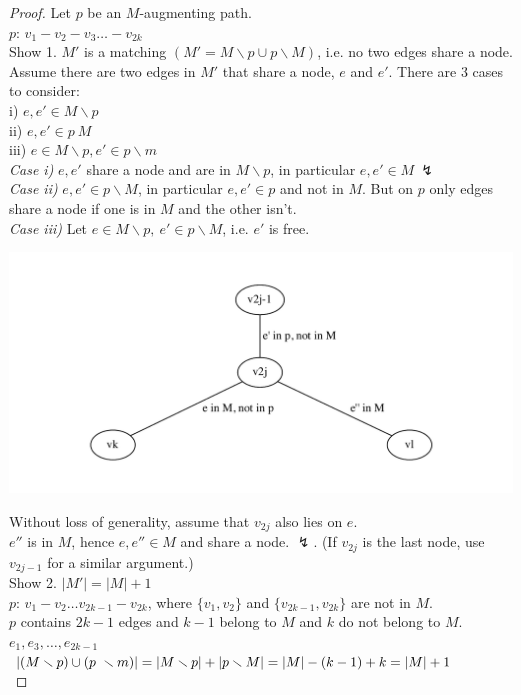 \begin{proof}
Let $p$ be an $M$-augmenting path. \\$p$: $v_{1} - v_{2} - v_{3} \dots -
v_{2k}$\\
Show 1. $M'$ is a matching $(M' = M \smallsetminus p \cup p \smallsetminus M)$, i.e. no two
edges share a node. Assume there are two edges in $M'$ that share a node, $e$
and $e'$. There are 3 cases to consider:\\
i) $e, e' \in M \smallsetminus p$ \\
ii) $e, e' \in p \ M$  \\
iii) $e \in M \smallsetminus p, e' \in p \smallsetminus m$ \\
\emph{Case i)} $e, e'$ share a node and are in $M \smallsetminus p$, in particular $e,
e' \in M \: \lightning $ \\
\emph{Case ii)} $e, e' \in p \smallsetminus M$, in particular $e, e' \in p$ and not in
$M$. But on $p$ only edges share a node if one is in $M$ and the other isn't. \\
\emph{Case iii)} Let $e \in M \smallsetminus p, \: e' \in p \smallsetminus M$,
i.e. $e'$ is free. 
\begin{example*}
		\includegraphics[scale=0.65]{diagrams/Chapter4_Example8.pdf}\\
\end{example*}
Without loss of generality, assume that $v_{2j}$ also lies on $e$. \\
$e''$ is in $M$, hence $e, e'' \in M$ and share a node. $\lightning$. (If
$v_{2j}$ is the last node, use $v_{2j-1}$ for a similar argument.) \\
Show 2. $|M'| = |M| + 1$ \\
$p$: $v_{1} - v_{2} \dots v_{2k-1} - v_{2k}$, where $\{v_{1}, v_{2}\}$ and
$\{v_{2k-1}, v_{2k}\}$ are not in $M$. \\
$p$ contains $2k-1$ edges and $k-1$ belong to $M$ and $k$ do not belong to $M$.\\
$e_{1}, e_{3}, \dots, e_{2k-1}$ \\
$|(M \smallsetminus p) \cup (p \smallsetminus m)| = |M \smallsetminus p| + |p \smallsetminus M|\\ =
|M| - (k-1) + k \\ = |M| + 1$\\
\end{proof}
